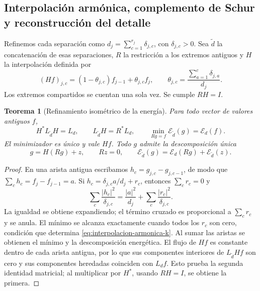 \documentclass[a4paper,10pt]{article}
\newtheorem{theorem}{Teorema}[section]
\theoremstyle{definition}\newtheorem{definition}[theorem]{Definición}
\theoremstyle{remark}\newtheorem{remark}[theorem]{Observación}
\numberwithin{equation}{section}
\begin{document}
\subsection{Interpolación armónica, complemento de Schur y reconstrucción del detalle}

Refinemos cada separación como
\(d_j=\sum_{c=1}^{r_j}\delta_{j,c}\), con \(\delta_{j,c}>0\).
Sea \(\widetilde d\) la concatenación de esas separaciones, \(R\) la
restricción a los extremos antiguos y \(H\) la interpolación definida por
\begin{equation}
 (Hf)_{j,c}=(1-\theta_{j,c})f_{j-1}+\theta_{j,c}f_j,
 \qquad
 \theta_{j,c}=\frac{\sum_{a=1}^c\delta_{j,a}}{d_j}.
 \label{eq:interpolacion-armonica-k}
\end{equation}
Los extremos compartidos se cuentan una sola vez. Se cumple \(RH=I\).

\begin{theorem}[Refinamiento isométrico de la energía]
\label{thm:energia-schur-refinamiento}
Para todo vector de valores antiguos \(f\),
\begin{equation}
 H^*L_{\widetilde d}H=L_d,
 \qquad L_{\widetilde d}H=R^*L_d,
 \qquad
 \min_{Rg=f}\mathcal E_{\widetilde d}(g)=\mathcal E_d(f).
 \label{eq:isometria-energia-k}
\end{equation}
El minimizador es único y vale \(Hf\). Todo \(g\) admite la
descomposición única
\begin{equation}
 g=H(Rg)+z,\qquad Rz=0,
 \qquad
 \mathcal E_{\widetilde d}(g)
 =\mathcal E_d(Rg)+\mathcal E_{\widetilde d}(z).
 \label{eq:detalle-energia-k}
\end{equation}
\end{theorem}
\begin{proof}
En una arista antigua escribamos \(h_c=g_{j,c}-g_{j,c-1}\), de modo
que \(\sum_ch_c=f_j-f_{j-1}=a\). Si
\(h_c=\delta_{j,c}a/d_j+r_c\), entonces \(\sum_cr_c=0\) y
\[
 \sum_c\frac{|h_c|^2}{\delta_{j,c}}
 =\frac{|a|^2}{d_j}+\sum_c\frac{|r_c|^2}{\delta_{j,c}}.
\]
La igualdad se obtiene expandiendo; el término cruzado es proporcional a
\(\sum_cr_c\) y se anula. El mínimo se alcanza exactamente cuando
todos los \(r_c\) son cero, condición que determina
\eqref{eq:interpolacion-armonica-k}. Al sumar las aristas se obtienen
el mínimo y la descomposición energética. El flujo de \(Hf\) es
constante dentro de cada arista antigua, por lo que sus componentes
interiores de \(L_{\widetilde d}Hf\) son cero y sus componentes heredadas
coinciden con \(L_df\). Esto prueba la segunda identidad matricial; al
multiplicar por \(H^*\), usando \(RH=I\), se obtiene la primera.
\end{proof}
\end{document}
